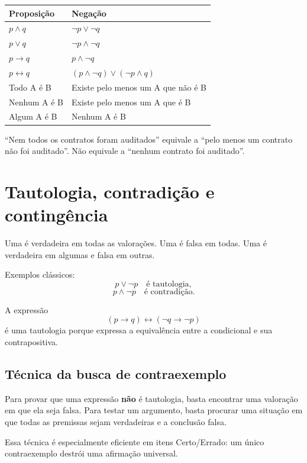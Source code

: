 \begin{table}[ht]
\centering
\small
\begin{tabularx}{\textwidth}{X X}
\toprule
Proposição & Negação \\
\midrule
$p\land q$ & $\neg p\lor\neg q$ \\
$p\lor q$ & $\neg p\land\neg q$ \\
$p\to q$ & $p\land\neg q$ \\
$p\leftrightarrow q$ & $(p\land\neg q)\lor(\neg p\land q)$ \\
Todo A é B & Existe pelo menos um A que não é B \\
Nenhum A é B & Existe pelo menos um A que é B \\
Algum A é B & Nenhum A é B \\
\bottomrule
\end{tabularx}
\end{table}

\begin{cebraspe}
``Nem todos os contratos foram auditados'' equivale a ``pelo menos um contrato não foi auditado''. Não equivale a ``nenhum contrato foi auditado''.
\end{cebraspe}

\section{Tautologia, contradição e contingência}

Uma  é verdadeira em todas as valorações. Uma  é falsa em todas. Uma  é verdadeira em algumas e falsa em outras.

Exemplos clássicos:
\[
p\lor\neg p \quad \text{é tautologia},
\]
\[
p\land\neg p \quad \text{é contradição}.
\]

A expressão
\[
(p\to q)\leftrightarrow(\neg q\to\neg p)
\]
é uma tautologia porque expressa a equivalência entre a condicional e sua contrapositiva.

\subsection{Técnica da busca de contraexemplo}

Para provar que uma expressão \textbf{não} é tautologia, basta encontrar uma valoração em que ela seja falsa. Para testar um argumento, basta procurar uma situação em que todas as premissas sejam verdadeiras e a conclusão falsa.

Essa técnica é especialmente eficiente em itens Certo/Errado: um único contraexemplo destrói uma afirmação universal.

